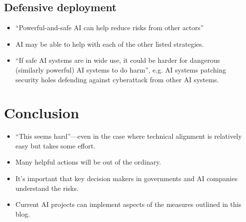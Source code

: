 \documentclass{article}
\begin{document}
\begin{multicols}{2}
\subsection{Defensive deployment}
\begin{itemize}
\item ``Powerful-and-safe AI can help reduce risks from other actors''
\item AI may be able to help with each of the other listed strategies.
\item ``If safe AI systems are in wide use, it could be harder for dangerous (similarly powerful) AI systems to do harm'', e.g. AI systems patching security holes defending against cyberattack from other AI systems.
\end{itemize}

\section{Conclusion}
\begin{itemize}
\item ``This seems hard''—even in the case where technical alignment is relatively easy but takes some effort.
\item Many helpful actions will be out of the ordinary.
\item It's important that key decision makers in governments and AI companies understand the risks.
\item Current AI projects can implement aspects of the measures outlined in this blog.
\end{itemize}
\end{multicols}
\end{document}

